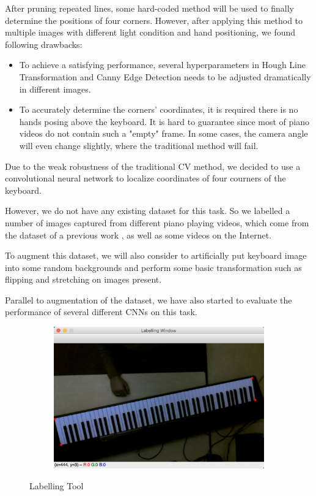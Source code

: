 \documentclass[10pt,twocolumn,letterpaper]{article}
\begin{document}
After pruning repeated lines, some hard-coded method will be used to finally determine the positions of four corners. However, after applying this method to multiple images with different light condition and hand positioning, we found following drawbacks:

\begin{itemize}
  \item To achieve a satisfying performance, several hyperparameters in Hough Line Transformation and Canny Edge Detection needs to be adjusted dramatically in different images.
  \item To accurately determine the corners' coordinates, it is required there is no hands posing above the keyboard. It is hard to guarantee since most of piano videos do not contain such a "empty" frame. In some cases, the camera angle will even change slightly, where the traditional method will fail.
\end{itemize}

Due to the weak robustness of the traditional CV method, we decided to use a convolutional neural network to localize coordinates of four courners of the keyboard. 

However, we do not have any existing dataset for this task. 
So we labelled a number of images captured from different piano playing videos, which come from the dataset of a previous work \cite{Akbari}, as well as some videos on the Internet.

To augment this dataset, we will also consider to artificially put keyboard image into some random backgrounds and perform some basic transformation such as flipping and stretching on images present.

Parallel to augmentation of the dataset, we have also started to evaluate the performance of several different CNNs on this task.

\begin{figure}[h!]
  \hspace{2.1cm}
  \begin{subfigure}{0.24\textwidth}
    \includegraphics[width=\linewidth]{fig/7.png}
  \end{subfigure}
  \caption{Labelling Tool}
\end{figure}
\end{document}
